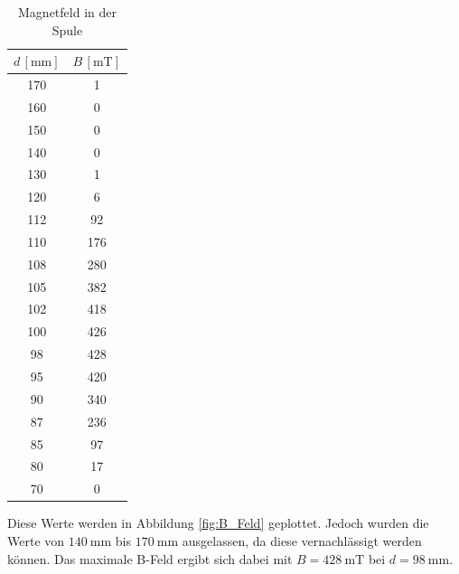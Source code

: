 \begin{table}[H]
	\centering
	\label{tab:B_Feld}
	\begin{tabular}{c c}
		\toprule
		$d \, [\unit{\milli\meter}]$ & $B \, [\unit{\milli\tesla}] $ \\
		\midrule
		170                          & 1                             \\
		160                          & 0                             \\
		150                          & 0                             \\
		140                          & 0                             \\
		130                          & 1                             \\
		120                          & 6                             \\
		112                          & 92                            \\
		110                          & 176                           \\
		108                          & 280                           \\
		105                          & 382                           \\
		102                          & 418                           \\
		100                          & 426                           \\
		98                           & 428                           \\
		95                           & 420                           \\
		90                           & 340                           \\
		87                           & 236                           \\
		85                           & 97                            \\
		80                           & 17                            \\
		70                           & 0                             \\
		\bottomrule
	\end{tabular}
	\caption{Magnetfeld in der Spule}\label{tab:B_Feld}
\end{table}

Diese Werte werden in Abbildung \eqref{fig:B_Feld} geplottet. Jedoch wurden die
Werte von $\qty{140}{\milli\meter}$ bis $\qty{170}{\milli\meter}$ ausgelassen,
da diese vernachlässigt werden können. Das maximale B-Feld ergibt sich dabei
mit $B=\qty{428}{\milli\tesla}$ bei $d=\qty{98}{\milli\meter}$.

